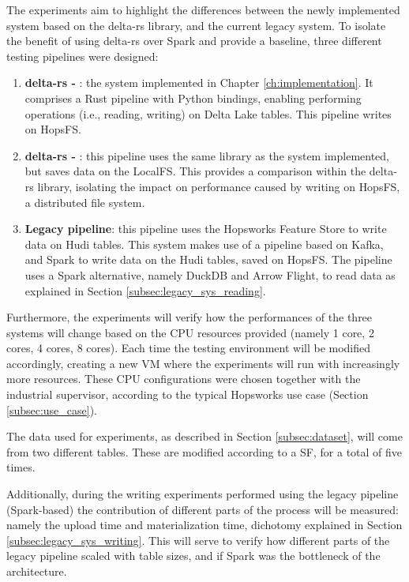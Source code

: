 The experiments aim to highlight the differences between the newly implemented system based on the delta-rs library, and the current legacy system. To isolate the benefit of using delta-rs over Spark and provide a baseline, three different testing pipelines were designed:
\begin{enumerate}
    \item \textbf{delta-rs - }: the system implemented in Chapter \ref{ch:implementation}. It comprises a Rust pipeline with Python bindings, enabling performing operations (i.e., reading, writing) on Delta Lake tables. This pipeline writes on \gls{HopsFS}.
    \item \textbf{delta-rs - }: this pipeline uses the same library as the system implemented, but saves data on the \gls{LocalFS}. This provides a comparison within the delta-rs library, isolating the impact on performance caused by writing on \gls{HopsFS}, a distributed file system.
    \item \textbf{Legacy pipeline}: this pipeline uses the Hopsworks Feature Store to write data on Hudi tables. This system makes use of a pipeline based on Kafka, and Spark to write data on the Hudi tables, saved on \gls{HopsFS}. The pipeline uses a Spark alternative, namely DuckDB and Arrow Flight, to read data as explained in Section \ref{subsec:legacy_sys_reading}. 
\end{enumerate}

Furthermore, the experiments will verify how the performances of the three systems will change based on the \gls{CPU} resources provided (namely 1 core, 2 cores, 4 cores, 8 cores). Each time the testing environment will be modified accordingly, creating a new \gls{VM} where the experiments will run with increasingly more resources. These \gls{CPU} configurations were chosen together with the industrial supervisor, according to the typical Hopsworks use case (Section \ref{subsec:use_case}).

The data used for experiments, as described in Section \ref{subsec:dataset}, will come from two different tables. These are modified according to a \gls{SF}, for a total of five times.

Additionally, during the writing experiments performed using the legacy pipeline (Spark-based) the contribution of different parts of the process will be measured: namely the upload time and materialization time, dichotomy explained in Section \ref{subsec:legacy_sys_writing}. This will serve to verify how different parts of the legacy pipeline scaled with table sizes, and if Spark was the bottleneck of the architecture.

